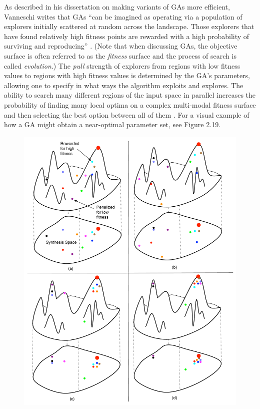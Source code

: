 \documentclass[a4paper,12pt]{report} 	%
\numberwithin{figure}{chapter}
\numberwithin{table}{chapter}
\numberwithin{equation}{chapter}
\begin{document}
\begin{flushleft}
As described in his dissertation on making variants of GAs more efficient, Vanneschi writes that GAs ``can be imagined as operating via a population of explorers initially scattered at random across the landscape. Those explorers that have found relatively high fitness points are rewarded with a high probability of surviving and reproducing'' \cite[p. 70]{Vanneschi:2004le}. (Note that when discussing GAs, the objective surface is often referred to as the \emph{fitness} surface and the process of search is called \emph{evolution}.) The \emph{pull} strength of explorers from regions with low fitness values to regions with high fitness values is determined by the GA's parameters, allowing one to specify in what ways the algorithm exploits and explores. The ability to search many different regions of the input space in parallel increases the probability of finding many local optima on a complex multi-modal fitness surface and then selecting the best option between all of them \cite[p. 37]{Garcia:2001jw}. For a visual example of how a GA might obtain a near-optimal parameter set, see Figure 2.19.
\\
\begin{figure}[h!]
\begin{center}
\includegraphics[scale=0.50]{GASearch}

\end{center}
\end{figure}
\end{flushleft}
\end{document}
